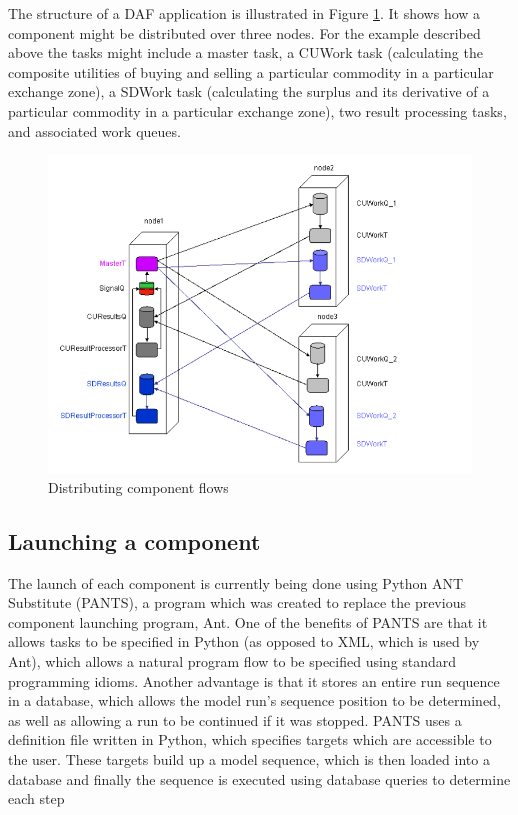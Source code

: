 The structure of a DAF application is illustrated in Figure \ref{fig:daf-example}. It shows how a component might be distributed over three nodes. For the example described above the tasks might include a master task, a CUWork task (calculating the composite utilities of buying and selling a particular commodity in a particular exchange zone), a SDWork task (calculating the surplus and its derivative of a particular commodity in a particular exchange zone), two result processing tasks, and associated work queues.

\begin{figure}
\centering
\includegraphics[width=5in]{overview/distributing-pi-module}
\caption{Distributing component flows}
\label{fig:daf-example}
\end{figure}

\subsection{Launching a component}
The launch of each component is currently being done using Python ANT Substitute (PANTS), a program which was created to replace the previous component launching program, Ant. One of the benefits of PANTS are that it allows tasks to be specified in Python (as opposed to XML, which is used by Ant), which allows a natural program flow to be specified using standard programming idioms. Another advantage is that it stores an entire run sequence in a database, which allows the model run's sequence position to be determined, as well as allowing a run to be continued if it was stopped. PANTS uses a definition file written in Python, which specifies targets which are accessible to the user. These targets build up a model sequence, which is then loaded into a database and finally the sequence is executed using database queries to determine each step

